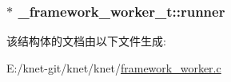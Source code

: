 \subsubsection[{runner}]{$\ast$ \+\_\+framework\+\_\+worker\+\_\+t\+::runner}\label{a00012_a815b2ce0f2ea29ae265bb7dc2e804165_a815b2ce0f2ea29ae265bb7dc2e804165}


该结构体的文档由以下文件生成\+:\begin{DoxyCompactItemize}
\item 
E\+:/knet-\/git/knet/knet/\hyperlink{a00053}{framework\+\_\+worker.\+c}\end{DoxyCompactItemize}
